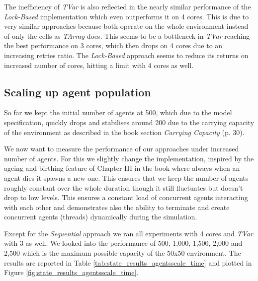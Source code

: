 The inefficiency of \textit{TVar} is also reflected in the nearly similar performance of the \textit{Lock-Based} implementation which even outperforms it on 4 cores. This is due to very similar approaches because both operate on the whole environment instead of only the cells as \textit{TArray} does. This seems to be a bottleneck in \textit{TVar} reaching the best performance on 3 cores, which then drops on 4 cores due to an increasing retries ratio. The \textit{Lock-Based} approach seems to reduce its returns on increased number of cores, hitting a limit with 4 cores as well.

\subsection{Scaling up agent population}
So far we kept the initial number of agents at 500, which due to the model specification, quickly drops and stabilises around 200 due to the carrying capacity of the environment as described in the book \cite{epstein_growing_1996} section \textit{Carrying Capacity} (p. 30).

We now want to measure the performance of our approaches under increased number of agents. For this we slightly change the implementation, inspired by the ageing and birthing feature of Chapter III in the book \cite{epstein_growing_1996} where always when an agent dies it spawns a new one. This ensures that we keep the number of agents roughly constant over the whole duration though it still fluctuates but doesn't drop to low levels. This ensures a constant load of concurrent agents interacting with each other and demonstrates also the ability to terminate and create concurrent agents (threads) dynamically during the simulation.

Except for the \textit{Sequential} approach we ran all experiments with 4 cores and \textit{TVar} with 3 as well. We looked into the performance of 500, 1,000, 1,500, 2,000 and 2,500 which is the maximum possible capacity of the 50x50 environment. The results are reported in Table \ref{tab:state_results_agentsscale_time} and plotted in Figure \ref{fig:state_results_agentsscale_time}.

